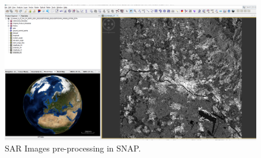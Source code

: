 \begin{figure}[H]
    \centering
    \includegraphics[width=1\textwidth]{../../Images/PNG/snap_1.png}
    \caption[SAR Images pre-processing  in the SNAP]{SAR Images pre-processing  in SNAP.}
    \label{fig:alaska-areaf}
\end{figure}







